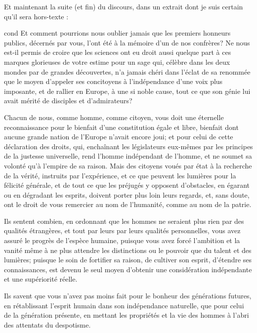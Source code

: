 \documentclass[12pt,space=onehalf,version=final]{yathesis}
\begin{document}
Et maintenant la suite (et fin) du discours, dans un extrait dont je
suis certain qu'il sera \og hors-texte\fg{} :
%
\begin{displaycquote}[pp.~509-511]{cond}
  Et comment pourrions nous oublier jamais que les premiers honneurs
  publics, décernés par vous, l'ont été à la mémoire d'un de nos
  confrères? Ne nous est-il permis de croire que les sciences ont eu
  droit aussi quelque part à ces marques glorieuses de votre estime
  pour un sage qui, célèbre dans les deux mondes par de grandes
  découvertes, n'a jamais chéri dans l'éclat de sa renommée que le
  moyen d'appeler ses concitoyens à l'indépendance d'une voix plus
  imposante, et de rallier en Europe, à une si noble cause, tout ce
  que son génie lui avait mérité de disciples et d'admirateurs?

  Chacun de nous, comme homme, comme citoyen, vous doit une éternelle
  reconnaissance pour le bienfait d'une constitution égale et libre,
  bienfait dont aucune grande nation de l'Europe n'avait encore joui;
  et pour celui de cette déclaration des droits, qui, enchaînant les
  législateurs eux-mêmes par les principes de la justesse universelle,
  rend l'homme indépendant de l'homme, et ne soumet sa volonté qu'à
  l'empire de sa raison.  Mais des citoyens voués par état à la
  recherche de la vérité, instruits par l'expérience, et ce que
  peuvent les lumières pour la félicité générale, et de tout ce que
  les préjugés y opposent d'obstacles, en égarant ou en dégradant les
  esprits, doivent porter plus loin leurs regards, et, sans doute, ont
  le droit de vous remercier au nom de l'humanité, comme au nom de la
  patrie.

  Ils sentent combien, en ordonnant que les hommes ne seraient plus
  rien par des qualités étrangères, et tout par leurs par leurs
  qualités personnelles, vous avez assuré le progrès de l'espèce
  humaine, puisque vous avez forcé l'ambition et la vanité même à ne
  plus attendre les distinctions ou le pouvoir que du talent et des
  lumières; puisque le soin de fortifier sa raison, de cultiver son
  esprit, d'étendre ses connaissances, est devenu le seul moyen
  d'obtenir une considération indépendante et une supériorité réelle.

  Ils savent que vous n'avez pas moins fait pour le bonheur des
  générations futures, en rétablissant l'esprit humain dans son
  indépendance naturelle, que pour celui de la génération présente, en
  mettant les propriétés et la vie des hommes à l'abri des attentats
  du despotisme.


\end{displaycquote}
\end{document}
